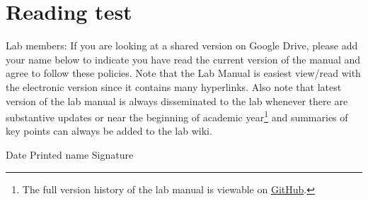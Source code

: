 \documentclass[letterpaper,12pt,oneside]{memoir}
\begin{document}
\chapter*{Reading test}
\noindent Lab members: If you are looking at a shared version on Google Drive, please add your name below to indicate you have read the current version of the manual and agree to follow these policies. Note that the Lab Manual is easiest view/read with the electronic version since it contains many hyperlinks. Also note that latest version of the lab manual is always disseminated to the lab whenever there are substantive updates or near the beginning of academic year\footnote{The full version history of the lab manual is viewable on \href{https://github.com/DVSneuro/smithlab_manual}{GitHub}.} and summaries of key points can always be added to the lab wiki.

\vspace{,5in}

\noindent Date \hspace{.5in} Printed name \hspace{1.5in} Signature\\
\end{document}

